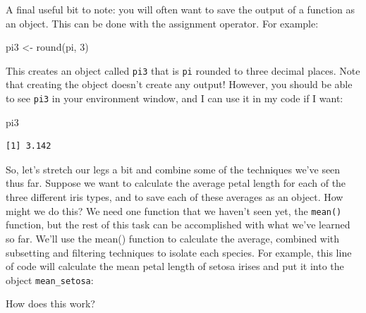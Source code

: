 \documentclass[
  letterpaper,
]{book}
\newenvironment{Shaded}{\begin{snugshade}}{\end{snugshade}}
\newcommand{\DecValTok}[1]{\textcolor[rgb]{0.68,0.00,0.00}{#1}}
\newcommand{\FunctionTok}[1]{\textcolor[rgb]{0.28,0.35,0.67}{#1}}
\newcommand{\NormalTok}[1]{\textcolor[rgb]{0.00,0.23,0.31}{#1}}
\newcommand{\OtherTok}[1]{\textcolor[rgb]{0.00,0.23,0.31}{#1}}
\newcommand{\SpecialCharTok}[1]{\textcolor[rgb]{0.37,0.37,0.37}{#1}}
\newcommand{\StringTok}[1]{\textcolor[rgb]{0.13,0.47,0.30}{#1}}
\begin{document}
A final useful bit to note: you will often want to save the output of a
function as an object. This can be done with the assignment operator.
For example:

\begin{Shaded}
\begin{Highlighting}[]
\NormalTok{pi3 }\OtherTok{\textless{}{-}} \FunctionTok{round}\NormalTok{(pi, }\DecValTok{3}\NormalTok{)}
\end{Highlighting}
\end{Shaded}

This creates an object called \texttt{pi3} that is \texttt{pi} rounded
to three decimal places. Note that creating the object doesn't create
any output! However, you should be able to see \texttt{pi3} in your
environment window, and I can use it in my code if I want:

\begin{Shaded}
\begin{Highlighting}[]
\NormalTok{pi3}
\end{Highlighting}
\end{Shaded}

\begin{verbatim}
[1] 3.142
\end{verbatim}

So, let's stretch our legs a bit and combine some of the techniques
we've seen thus far. Suppose we want to calculate the average petal
length for each of the three different iris types, and to save each of
these averages as an object. How might we do this? We need one function
that we haven't seen yet, the \texttt{mean()} function, but the rest of
this task can be accomplished with what we've learned so far. We'll use
the mean() function to calculate the average, combined with subsetting
and filtering techniques to isolate each species. For example, this line
of code will calculate the mean petal length of setosa irises and put it
into the object \texttt{mean\_setosa}:

\begin{Shaded}
\end{Shaded}

How does this work?
\end{document}
